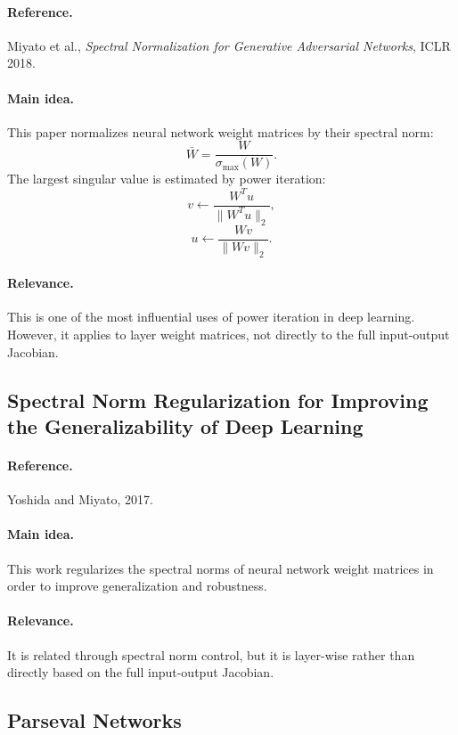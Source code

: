 \documentclass{article}
\begin{document}
\paragraph{Reference.}
Miyato et al., \emph{Spectral Normalization for Generative Adversarial Networks}, ICLR 2018.

\paragraph{Main idea.}
This paper normalizes neural network weight matrices by their spectral norm:
\[
\bar W=\frac{W}{\sigma_{\max}(W)}.
\]
The largest singular value is estimated by power iteration:
\[
v\leftarrow \frac{W^Tu}{\|W^Tu\|_2},
\]
\[
u\leftarrow \frac{Wv}{\|Wv\|_2}.
\]

\paragraph{Relevance.}
This is one of the most influential uses of power iteration in deep learning. However, it applies to layer weight matrices, not directly to the full input-output Jacobian.

\subsection{Spectral Norm Regularization for Improving the Generalizability of Deep Learning}

\paragraph{Reference.}
Yoshida and Miyato, 2017.

\paragraph{Main idea.}
This work regularizes the spectral norms of neural network weight matrices in order to improve generalization and robustness.

\paragraph{Relevance.}
It is related through spectral norm control, but it is layer-wise rather than directly based on the full input-output Jacobian.

\subsection{Parseval Networks}
\end{document}
